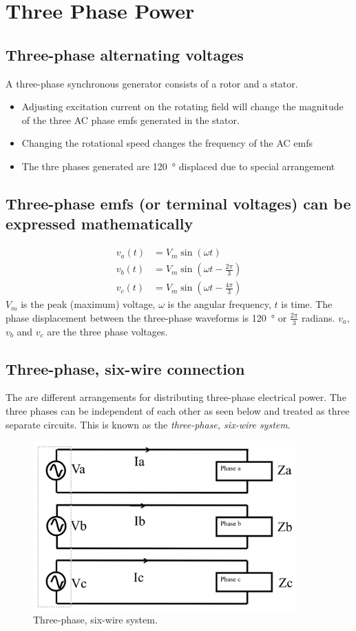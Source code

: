 \documentclass[class=report, crop=false, 12pt,a4paper]{standalone}
\begin{document}
\section{Three Phase Power}
\subsection{Three-phase alternating voltages}
A three-phase synchronous generator consists of a rotor and a stator.
\begin{itemize}
	\item Adjusting excitation current on the rotating field will change the magnitude of the three AC phase emfs generated in the stator.
	\item Changing the rotational speed changes the frequency of the AC emfs
	\item The thre phases generated are \SI{120}{\degree} displaced due to special arrangement
\end{itemize}
\subsection{Three-phase emfs (or terminal voltages) can be expressed mathematically}
\begin{align}
	v_a\left( t\right) &= V_m \sin\left( \omega t\right)\\
	v_b\left( t\right) &= V_m \sin\left( \omega t - \frac{2\pi}{3}\right)\\
	v_c\left( t\right) &= V_m \sin\left( \omega t - \frac{4\pi}{3}\right)
\end{align}
$V_m$ is the peak (maximum) voltage, $\omega$ is the angular frequency, $t$ is time. The phase displacement between the three-phase waveforms is \SI{120}{\degree} or $\frac{2\pi}{3}$ radians. $v_a$, $v_b$ and $v_c$ are the three phase voltages.
\subsection{Three-phase, six-wire connection}
The are different arrangements for distributing three-phase electrical power. The three phases can be independent of each other as seen below and treated as three separate circuits. This is known as the \textit{three-phase, six-wire system}.
\begin{figure}[H]
	\centering
	\includegraphics[width = 0.9\textwidth]{../img/figure6.png}
	\caption{Three-phase, six-wire system.}
\end{figure}
\end{document}
